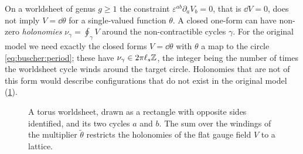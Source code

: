 On a worldsheet of genus $g\ge1$ the constraint $\varepsilon^{ab}\partial_aV_b=0$, that is
$\dd V=0$, does not imply $V=\dd\theta$ for a single-valued function $\theta$. A closed
one-form can have non-zero \emph{holonomies}
$\nu_\gamma=\oint_\gamma V$ around the non-contractible cycles $\gamma$. For the original
model we need exactly the closed forms $V=\dd\theta$ with $\theta$ a map to the circle
\eqref{eq:buscher:period}; these have $\nu_\gamma\in2\pi\ell_s\mathbb{Z}$, the integer being the
number of times the worldsheet cycle winds around the target circle. Holonomies that are not
of this form would describe configurations that do not exist in the original model
(\cref{fig:buscher:torus}).

\begin{figure}[t]
\centering
{}
\caption{A torus worldsheet, drawn as a rectangle with opposite sides identified, and its two
cycles $a$ and $b$. The sum over the windings of the multiplier $\tilde\theta$ restricts the
holonomies of the flat gauge field $V$ to a lattice.}
\label{fig:buscher:torus}
\end{figure}

